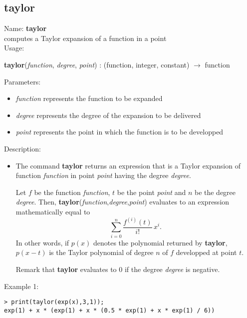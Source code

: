\subsection{taylor}
\label{labtaylor}
\noindent Name: \textbf{taylor}\\
computes a Taylor expansion of a function in a point\\
\noindent Usage: 
\begin{center}
\textbf{taylor}(\emph{function}, \emph{degree}, \emph{point}) : (\textsf{function}, \textsf{integer}, \textsf{constant}) $\rightarrow$ \textsf{function}\\
\end{center}
Parameters: 
\begin{itemize}
\item \emph{function} represents the function to be expanded
\item \emph{degree} represents the degree of the expansion to be delivered
\item \emph{point} represents the point in which the function is to be developped
\end{itemize}
\noindent Description: \begin{itemize}

\item The command \textbf{taylor} returns an expression that is a Taylor expansion
   of function \emph{function} in point \emph{point} having the degree \emph{degree}.
    
   Let $f$ be the function \emph{function}, $t$ be the point \emph{point} and
   $n$ be the degree \emph{degree}. Then, \textbf{taylor}(\emph{function},\emph{degree},\emph{point}) 
   evaluates to an expression mathematically equal to
   $$\sum\limits_{i=0}^n \frac{f^{(i)}\left(t\right)}{i!}\,x^i.$$
   In other words, if $p(x)$ denotes the polynomial returned by \textbf{taylor},
   $p(x-t)$ is the Taylor polynomial of degree $n$ of $f$ developped at point $t$.
    
   Remark that \textbf{taylor} evaluates to $0$ if the degree \emph{degree} is negative.
\end{itemize}
\noindent Example 1: 
\begin{center}\begin{minipage}{15cm}\begin{Verbatim}[frame=single]
> print(taylor(exp(x),3,1));
exp(1) + x * (exp(1) + x * (0.5 * exp(1) + x * exp(1) / 6))
\end{Verbatim}
\end{minipage}\end{center}
